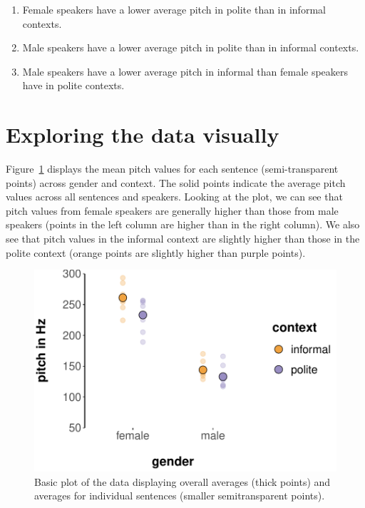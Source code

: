 \documentclass[nobib]{tufte-handout}
\begin{document}
\begin{enumerate}[{H}1:]
\item Female speakers have a lower average pitch in polite than in informal contexts.
\item Male speakers have a lower average pitch in polite than in informal contexts.
\item Male speakers have a lower average pitch in informal than female speakers have in polite contexts.
\end{enumerate}

\section{Exploring the data visually}

Figure~\ref{fig:BasicPlotData_data} displays the mean pitch values for each
sentence (semi-transparent points) across gender and context.
%
%
The solid points indicate the average pitch values across all sentences and speakers.
Looking at the plot, we can see that pitch values from female speakers are generally higher
than those from male speakers (points in the left column are higher than in the right column).
We also see that pitch values in the informal context are slightly higher than those in the polite context (orange points are
slightly higher than purple points).

\begin{figure}[t]
  \centering
    \includegraphics[width = \textwidth]{pics/basic_data_plot.pdf}
    \caption{Basic plot of the data displaying overall averages (thick points) and averages for individual sentences (smaller semitransparent points).}
     \label{fig:BasicPlotData_data}
\end{figure}
\end{document}

